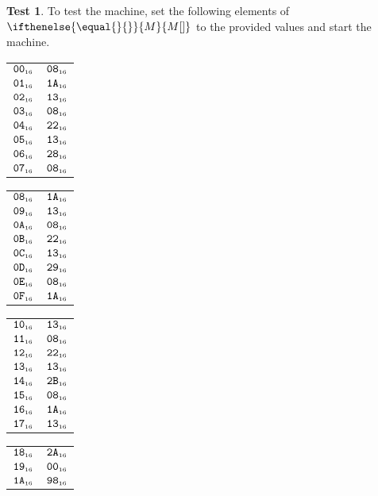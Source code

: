 \documentclass[a4paper,12pt]{article}
\makeatletter
\newcommand{\num}[1]{\texttt{#1}}
\newcommand{\hex}[1]{\num{#1}_{\textup{\tiny 16}}}
\newcommand{\MEM}[1]{\ifthenelse{\equal{#1}{}}{M}{M[#1]}}
\theoremstyle{definition}
\newtheorem{test}{Test}
\newenvironment{memtable}{%
  \begin{trivlist}
    \item
    }{%
    \end{trivlist}}
\newenvironment{memcolumn}{%
  \begin{tabular}{@{}ll@{}}
    \hline}
    {%
    \hline
  \end{tabular}}
\newcommand{\memspace}{\qquad}
\makeatother
\begin{document}
\begin{test}
  To test the machine, set the following elements of $\MEM{}$ to the provided values and start the machine.
  \begin{memtable}
    \begin{memcolumn}
      $\hex{00}$ & $\hex{08}$ \\
      $\hex{01}$ & $\hex{1A}$ \\
      $\hex{02}$ & $\hex{13}$ \\
      $\hex{03}$ & $\hex{08}$ \\
      $\hex{04}$ & $\hex{22}$ \\
      $\hex{05}$ & $\hex{13}$ \\
      $\hex{06}$ & $\hex{28}$ \\
      $\hex{07}$ & $\hex{08}$ \\
    \end{memcolumn}
    \memspace
    \begin{memcolumn}
      $\hex{08}$ & $\hex{1A}$ \\
      $\hex{09}$ & $\hex{13}$ \\
      $\hex{0A}$ & $\hex{08}$ \\
      $\hex{0B}$ & $\hex{22}$ \\
      $\hex{0C}$ & $\hex{13}$ \\
      $\hex{0D}$ & $\hex{29}$ \\
      $\hex{0E}$ & $\hex{08}$ \\
      $\hex{0F}$ & $\hex{1A}$ \\
    \end{memcolumn}
    \memspace
    \begin{memcolumn}
      $\hex{10}$ & $\hex{13}$ \\
      $\hex{11}$ & $\hex{08}$ \\
      $\hex{12}$ & $\hex{22}$ \\
      $\hex{13}$ & $\hex{13}$ \\
      $\hex{14}$ & $\hex{2B}$ \\
      $\hex{15}$ & $\hex{08}$ \\
      $\hex{16}$ & $\hex{1A}$ \\
      $\hex{17}$ & $\hex{13}$ \\
    \end{memcolumn}
    \memspace
    \begin{memcolumn}
      $\hex{18}$ & $\hex{2A}$ \\
      $\hex{19}$ & $\hex{00}$ \\
      $\hex{1A}$ & $\hex{98}$ \\

\end{memcolumn}
\end{memtable}
\end{test}
\end{document}

